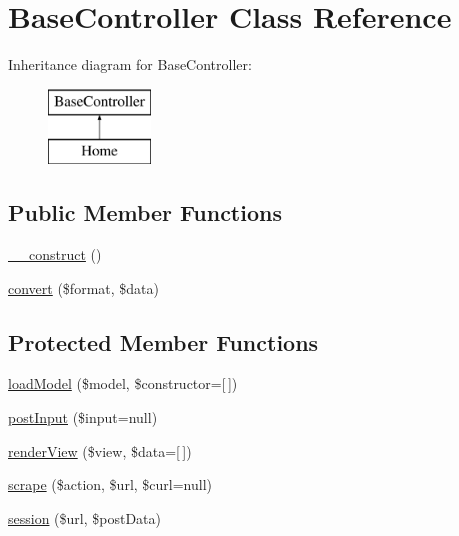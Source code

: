 \hypertarget{class_base_controller}{}\section{Base\+Controller Class Reference}
\label{class_base_controller}
Inheritance diagram for Base\+Controller\+:\begin{figure}[H]
\begin{center}
\leavevmode
\includegraphics[height=2.000000cm]{class_base_controller}
\end{center}
\end{figure}
\subsection*{Public Member Functions}
\begin{DoxyCompactItemize}
\item 
\hyperlink{class_base_controller_a095c5d389db211932136b53f25f39685}{\+\_\+\+\_\+construct} ()
\item 
\hyperlink{class_base_controller_a0fd54f433ce0bd8881479f3eb30e13ec}{convert} (\$format, \$data)
\end{DoxyCompactItemize}
\subsection*{Protected Member Functions}
\begin{DoxyCompactItemize}
\item 
\hyperlink{class_base_controller_a5fa8890bd3a9d20f5c0cc2377dc49eb1}{load\+Model} (\$model, \$constructor=\mbox{[}$\,$\mbox{]})
\item 
\hyperlink{class_base_controller_a170629218b28c1759a89c4978b9323b3}{post\+Input} (\$input=null)
\item 
\hyperlink{class_base_controller_aa0c49b95cd8e5ff8ff61b4a2c35bf1eb}{render\+View} (\$view, \$data=\mbox{[}$\,$\mbox{]})
\item 
\hyperlink{class_base_controller_abd4f25604b09a96c254491df97612cc3}{scrape} (\$action, \$url, \$curl=null)
\item 
\hyperlink{class_base_controller_a259a554926fc05640c8c711c340cdeac}{session} (\$url, \$post\+Data)
\end{DoxyCompactItemize}


